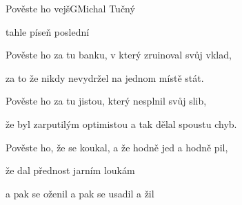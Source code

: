 \begin{song}{Pověste ho vejš}{G}{Michal Tučný}
\begin{SBChorus}
tahle  píseň poslední
\end{SBChorus}

\begin{SBVerse}

Pověste ho za tu banku, v který zruinoval svůj vklad,

za to že nikdy nevydržel na jednom místě stát.

\end{SBVerse}

\begin{SBChorus}

\end{SBChorus}

\begin{SBVerse}

Pověste ho za tu jistou, který nesplnil svůj slib,

že byl zarputilým optimistou a tak dělal spoustu chyb.

\end{SBVerse}

\begin{SBVerse}

Pověste ho, že se koukal, a že hodně jed a hodně pil,

že dal přednost jarním loukám

a pak se oženil a pak se usadil a žil

\end{SBVerse}

\begin{SBChorus}

\end{SBChorus}

\end{song}

\clearpage
